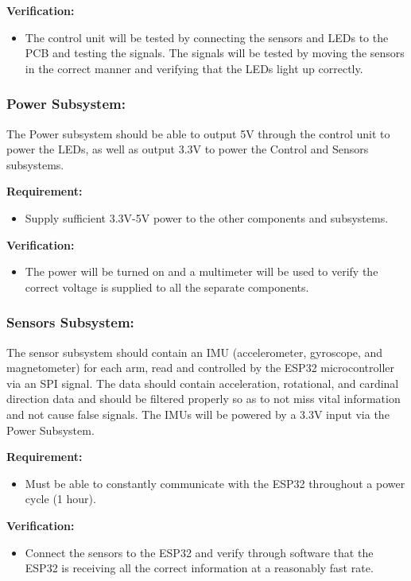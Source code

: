 \documentclass[12pt]{article}
\begin{document}
\textbf{Verification:}
\begin{itemize}
    \item The control unit will be tested by connecting the sensors and 
    LEDs to the PCB and testing the signals. The signals will be 
    tested by moving the sensors in the correct manner and 
    verifying that the LEDs light up correctly.
\end{itemize}

\subsubsection{Power Subsystem:} 
The Power subsystem should be able to output 5V through the control unit to power the LEDs, as well as output 3.3V to power the Control and Sensors subsystems. 

\textbf{Requirement:} 
\begin{itemize}
    \item Supply sufficient 3.3V-5V power to the 
    other components and subsystems.
\end{itemize}


\textbf{Verification:} 
\begin{itemize}
    \item The power will be turned on and a 
    multimeter will be used to verify the correct voltage is 
    supplied to all the separate components.
\end{itemize}

\subsubsection{Sensors Subsystem:}
The sensor subsystem should contain an IMU (accelerometer, gyroscope, and magnetometer) for each arm, read and controlled by the ESP32 microcontroller via an SPI signal. The data should contain acceleration, rotational, and cardinal direction data and should be filtered properly so as to not miss vital information and not cause false signals. The IMUs will be powered by a 3.3V input via the Power Subsystem.

\textbf{Requirement:}
\begin{itemize}
    \item Must be able to constantly communicate with the 
    ESP32 throughout a power cycle (1 hour). 
\end{itemize}


\textbf{Verification:}
\begin{itemize}
    \item Connect the sensors to the ESP32 and verify 
    through software that the ESP32 is receiving all the 
    correct information at a reasonably fast rate. 

\end{itemize}
\end{document}

